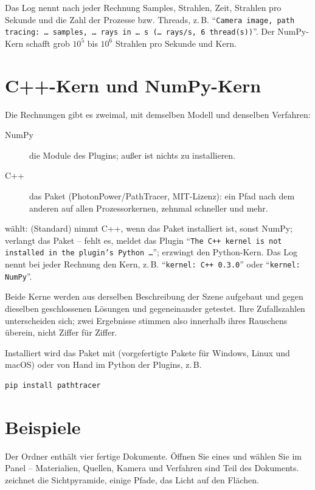 Das Log nennt nach jeder Rechnung Samples, Strahlen, Zeit, Strahlen pro Sekunde und die Zahl der
Prozesse bzw. Threads, z.\,B. \enquote{\texttt{Camera image, path tracing: … samples, … rays in
… s (… rays/s, 6 thread(s))}}. Der NumPy-Kern schafft grob $10^5$ bis $10^6$ Strahlen pro Sekunde
und Kern.

\section{C++-Kern und NumPy-Kern}\label{sec:pt-kerne}

Die Rechnungen gibt es zweimal, mit demselben Modell und denselben Verfahren:
\begin{description}
  \item[NumPy] die Module des Plugins; außer  ist nichts zu installieren.
  \item[C++] das Paket  (PhotonPower/PathTracer, MIT-Lizenz): ein Pfad nach dem
    anderen auf allen Prozessorkernen, zehnmal schneller und mehr.
\end{description}

 wählt:  (Standard) nimmt C++, wenn das Paket installiert ist, sonst
NumPy;  verlangt das Paket -- fehlt es, meldet das Plugin \enquote{\texttt{The C++
kernel is not installed in the plugin's Python …}};  erzwingt den Python-Kern. Das Log nennt bei jeder Rechnung den Kern,
z.\,B. \enquote{\texttt{kernel: C++ 0.3.0}} oder \enquote{\texttt{kernel: NumPy}}.

Beide Kerne werden aus derselben Beschreibung der Szene aufgebaut und gegen dieselben
geschlossenen Lösungen und gegeneinander getestet. Ihre Zufallszahlen unterscheiden sich; zwei
Ergebnisse stimmen also innerhalb ihres Rauschens überein, nicht Ziffer für Ziffer.

Installiert wird das Paket mit  (vorgefertigte Pakete für Windows, Linux
und macOS) oder von Hand im Python der Plugins, z.\,B.
\begin{lstlisting}
pip install pathtracer
\end{lstlisting}

\section{Beispiele}\label{sec:pt-beispiele}

Der Ordner  enthält vier fertige Dokumente. Öffnen Sie eines und
wählen Sie im Panel  -- Materialien, Quellen, Kamera und Verfahren sind Teil
des Dokuments.  zeichnet die Sichtpyramide,  einige
Pfade,  das Licht auf den Flächen.

